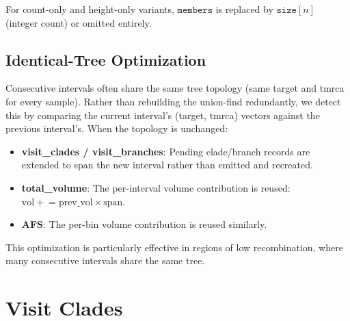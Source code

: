 \documentclass[11pt]{article}
\begin{document}
For count-only and height-only variants, $\texttt{members}$ is replaced by
$\texttt{size}[n]$ (integer count) or omitted entirely.

\subsection{Identical-Tree Optimization}

Consecutive intervals often share the same tree topology (same target and
tmrca for every sample).  Rather than rebuilding the union-find redundantly,
we detect this by comparing the current interval's (target, tmrca) vectors
against the previous interval's.  When the topology is unchanged:

\begin{itemize}
\item \textbf{visit\_clades / visit\_branches}: Pending clade/branch records
are extended to span the new interval rather than emitted and recreated.
\item \textbf{total\_volume}: The per-interval volume contribution is
reused: $\text{vol} \mathrel{+}= \text{prev\_vol} \times \text{span}$.
\item \textbf{AFS}: The per-bin volume contribution is reused similarly.
\end{itemize}

This optimization is particularly effective in regions of low recombination,
where many consecutive intervals share the same tree.

\section{Visit Clades}
\end{document}
